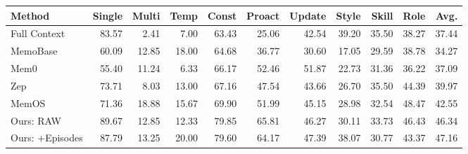 \begin{tabular}{lrrrrrrrrrr}
\toprule
Method & Single & Multi & Temp & Const & Proact & Update & Style & Skill & Role & Avg. \\
\midrule
Full Context & 83.57 & 2.41 & 7.00 & 63.43 & 25.06 & 42.54 & 39.20 & 35.50 & 38.27 & 37.44 \\
MemoBase & 60.09 & 12.85 & 18.00 & 64.68 & 36.77 & 30.60 & 17.05 & 29.59 & 38.78 & 34.27 \\
Mem0 & 55.40 & 11.24 & 6.33 & 66.17 & 52.46 & 51.87 & 22.73 & 31.36 & 36.22 & 37.09 \\
Zep & 73.71 & 8.03 & 13.00 & 67.16 & 47.54 & 43.66 & 26.70 & 35.50 & 44.39 & 39.97 \\
MemOS & 71.36 & 18.88 & 15.67 & 69.90 & 51.99 & 45.15 & 28.98 & 32.54 & 48.47 & 42.55 \\
\midrule
Ours: RAW & 89.67 & 12.85 & 12.33 & 79.85 & 65.81 & 46.27 & 30.11 & 33.73 & 46.43 & 46.34 \\
Ours: +Episodes & 87.79 & 13.25 & 20.00 & 79.60 & 64.17 & 47.39 & 38.07 & 30.77 & 43.37 & 47.16 \\
\bottomrule
\end{tabular}
